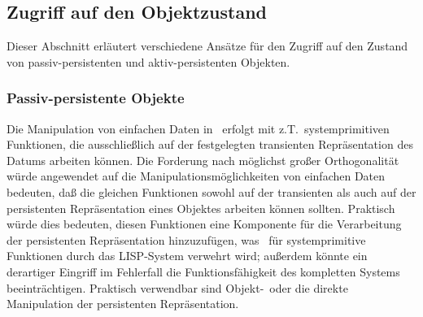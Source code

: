 \subsection{Zugriff auf den Objektzustand}
%
Dieser Abschnitt erl\"{a}utert verschiedene Ans\"{a}tze f\"{u}r den Zugriff auf
den Zustand von passiv-persistenten und aktiv-persistenten Objekten.
%
\subsubsection{Passiv-persistente Objekte}%
\label{sec:simpd}%
%
Die Manipulation von einfachen Daten in \cl\ erfolgt mit
z.T.\ systemprimitiven Funktionen, die ausschlie\ss{}lich auf der
festgelegten transienten Repr\"{a}sentation des Datums arbeiten k\"{o}nnen.
Die Forderung nach m\"{o}glichst gro\ss{}er Orthogonalit\"{a}t w\"{u}rde angewendet
auf die Manipulationsm\"{o}glichkeiten von einfachen Daten bedeuten, da\ss{}
die gleichen Funktionen sowohl auf der transienten als auch auf der
persistenten Repr\"{a}sentation eines Objektes arbeiten k\"{o}nnen
sollten. Praktisch w\"{u}rde dies bedeuten, diesen Funktionen eine
Komponente f\"{u}r die Verarbeitung der persistenten Repr\"{a}sentation
hinzuzuf\"{u}gen, was \ia\ f\"{u}r systemprimitive Funktionen durch
das LISP-System verwehrt wird; au\ss{}erdem k\"{o}nnte ein derartiger Eingriff
im Fehlerfall die Funktionsf\"{a}higkeit des kompletten Systems
beeintr\"{a}chtigen. Praktisch verwendbar sind Objekt-\swizzling\ oder
die direkte Manipulation der persistenten Repr\"{a}sentation.
%
